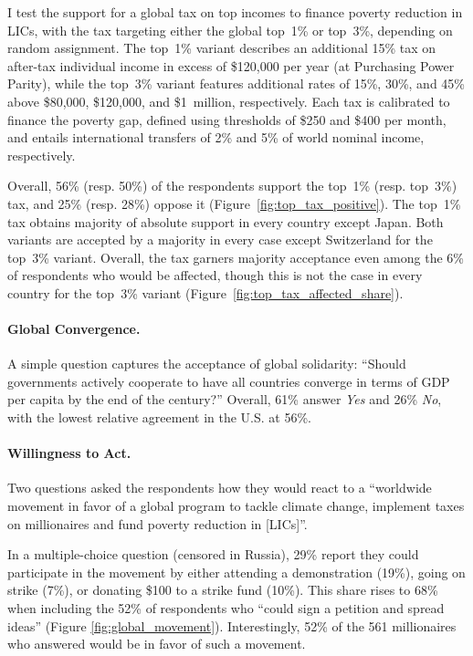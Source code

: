 \documentclass[12pt,english]{article}
\begin{document}
\begin{bibunit}
I test the support for a global tax on top incomes to finance poverty reduction in LICs, with the tax targeting either the global top~1\% or top~3\%, depending on random assignment. The top~1\% variant describes an additional 15\% tax on after-tax individual income in excess of \$120,000 per year (at Purchasing Power Parity), while the top~3\% variant features additional rates of 15\%, 30\%, and 45\% above \$80,000, \$120,000, and \$1~million, respectively. Each tax is calibrated to finance the poverty gap, defined using thresholds of \$250 and \$400 per month, and entails international transfers of 2\% and 5\% of world nominal income, respectively.

Overall, 56\% (resp. 50\%) of the respondents support the top~1\% (resp. top~3\%) tax, and 25\% (resp. 28\%) oppose it (Figure~\ref{fig:top_tax_positive}).
The top~1\% tax obtains majority of absolute support in every country except Japan.
Both variants are accepted by a majority in every case except Switzerland for the top~3\% variant.
Overall, the tax garners majority acceptance
even among the 6\% of respondents who would be affected, though this is not the case in every country for the top~3\% variant (Figure~\ref{fig:top_tax_affected_share}).

\paragraph{Global Convergence.}\label{par:convergence}

A simple question captures the acceptance of global solidarity: ``Should governments actively cooperate to have all countries converge in terms of GDP per capita by the end of the century?'' Overall, 61\% answer \textit{Yes} and 26\% \textit{No}, with the lowest relative agreement %
in the U.S. at 56\%.

\paragraph{Willingness to Act.}\label{par:willingness_act}

Two questions asked the respondents how they would react to a ``worldwide movement in favor of a global program to tackle climate change, implement taxes on millionaires and fund poverty reduction in [LICs]''.

In a multiple-choice question (censored in Russia), 29\% report they could participate in the movement by either attending a demonstration (19\%), going on strike (7\%), or donating \$100 to a strike fund (10\%). This share rises to 68\% when including the 52\% of respondents who ``could sign a petition and spread ideas'' (Figure \ref{fig:global_movement}).
Interestingly, 52\% of the 561 millionaires %
who answered would be in favor of such a movement.


\end{bibunit}
\end{document}
